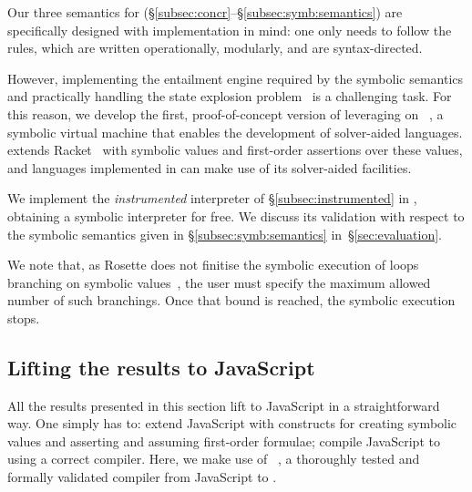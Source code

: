 Our three semantics for \jsil (\S\ref{subsec:concr}--\S\ref{subsec:symb:semantics}) are specifically designed with implementation in mind: one only needs to follow the rules, which are written operationally, modularly, and are syntax-directed. 

However, implementing the entailment engine required by the symbolic semantics and practically handling the state explosion problem~\cite{citemeimaturingawardwinner} is a challenging task. For this reason, we develop the first, proof-of-concept version of \cosette leveraging on 
\rosette~\cite{Rosette1,Rosette2}, a symbolic virtual machine that enables the development of solver-aided languages. \rosette extends Racket~\cite{racket} with symbolic values and first-order assertions over these values, and languages implemented in \rosette can make use of its solver-aided facilities. 

We implement the \emph{instrumented} \jsil interpreter of \S\ref{subsec:instrumented} in \rosette, obtaining a \jsil symbolic interpreter for free. We discuss its validation with respect to the symbolic semantics given in \S\ref{subsec:symb:semantics} in~\S\ref{sec:evaluation}.

We note that, as Rosette does not finitise the symbolic execution of loops branching on symbolic values~\cite{abstract:symbolic:exec}, the user must specify the maximum allowed number of such branchings. Once that bound is reached, the symbolic execution stops.


\subsection{Lifting the results to JavaScript}

All the results presented in this section lift to JavaScript in a straightforward way.
One simply has to: 
 extend JavaScript with constructs for creating symbolic values and 
asserting and assuming first-order formulae; 
 compile JavaScript to \jsil using a correct compiler. 
Here, we make use of \jstojsil~\cite{javert}, a thoroughly tested and formally validated compiler from 
JavaScript to \jsil.

